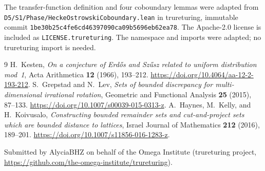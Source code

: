 \documentclass[11pt]{article}
\begin{document}
The transfer-function definition and four coboundary lemmas were adapted
from \nolinkurl{D5/S1/Phase/HeckeOstrowskiCoboundary.lean} in trureturing,
immutable commit \nolinkurl{1be30b25c4fe6cd46397090ca09b5696eb62ea78}.
The Apache-2.0 license is included as \nolinkurl{LICENSE.trureturing}.
The namespace and imports were adapted; no trureturing import is needed.

\begin{thebibliography}{9}
 H.~Kesten, \emph{On a conjecture of Erd\H{o}s and Sz\H{u}sz
related to uniform distribution mod~1}, Acta Arithmetica \textbf{12}
(1966), 193--212. \url{https://doi.org/10.4064/aa-12-2-193-212}.
 S.~Grepstad and N.~Lev, \emph{Sets of bounded discrepancy for
multi-dimensional irrational rotation}, Geometric and Functional
Analysis \textbf{25} (2015), 87--133.
\url{https://doi.org/10.1007/s00039-015-0313-z}.
 A.~Haynes, M.~Kelly, and H.~Koivusalo,
\emph{Constructing bounded remainder sets and cut-and-project sets which
are bounded distance to lattices}, Israel Journal of Mathematics
\textbf{212} (2016), 189--201.
\url{https://doi.org/10.1007/s11856-016-1283-z}.
\end{thebibliography}
\medskip
\noindent Submitted by AlyciaBHZ on behalf of the Omega Institute
(trureturing project, \url{https://github.com/the-omega-institute/trureturing}).
\end{document}
